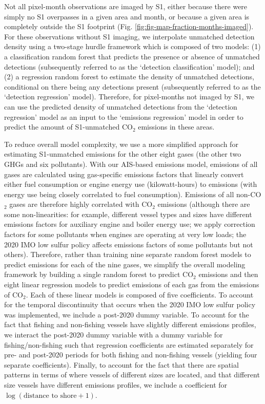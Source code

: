 \documentclass[lineno,pdflatex,sn-nature]{sn-jnl}
\begin{document}
Not all pixel-month observations are imaged by S1, either because there were simply no S1 overpasses in a given area and month, or because a given area is completely outside the S1 footprint (Fig. \ref{fig:fig-map-fraction-months-imaged}). For these observations without S1 imaging, we interpolate unmatched detection density using a two-stage hurdle framework which is composed of two models: (1) a classification random forest that predicts the presence or absence of unmatched detections (subsequently referred to as the `detection classification' model); and (2) a regression random forest to estimate the density of unmatched detections, conditional on there being any detections present  (subsequently referred to as the `detection regression' model). Therefore, for pixel-months not imaged by S1, we can use the predicted density of unmatched detections from the `detection regression' model as an input to the `emissions regression' model in order to predict the amount of S1-unmatched CO$_2$ emissions in these areas.


To reduce overall model complexity, we use a more simplified approach for estimating S1-unmatched emissions for the other eight gases (the other two GHGs and six pollutants). With our AIS-based emissions model, emissions of all gases are calculated using gas-specific emissions factors that linearly convert either fuel consumption or engine energy use (kilowatt-hours) to emissions (with energy use being closely correlated to fuel consumption). Emissions of all non-CO$_2$ gases are therefore highly correlated with CO$_2$ emissions (although there are some non-linearities: for example, different vessel types and sizes have different emissions factors for auxiliary engine and boiler energy use; we apply correction factors for some pollutants when engines are operating at very low loads; the 2020 IMO low sulfur policy affects emissions factors of some pollutants but not others). Therefore, rather than training nine separate random forest models to predict emissions for each of the nine gases, we simplify the overall modeling framework by building a single random forest to predict CO$_2$ emissions and then eight linear regression models to predict emissions of each gas from the emissions of CO$_2$. Each of these linear models is composed of five coefficients. To account for the temporal discontinuity that occurs when the 2020 IMO low sulfur policy was implemented, we include a post-2020 dummy variable. To account for the fact that fishing and non-fishing vessels have slightly different emissions profiles, we interact the post-2020 dummy variable with a dummy variable for fishing/non-fishing  such that regression coefficients are estimated separately for pre- and post-2020 periods for both fishing and non-fishing vessels (yielding four separate coefficients). Finally, to account for the fact that there are spatial patterns in terms of where vessels of different sizes are located, and that different size vessels have different emissions profiles, we include a coefficient for $\log(\text{distance to shore} + 1)$. 
\end{document}
